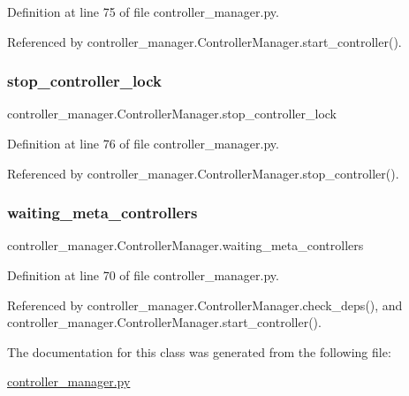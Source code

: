 Definition at line 75 of file controller\+\_\+manager.\+py.



Referenced by controller\+\_\+manager.\+Controller\+Manager.\+start\+\_\+controller().

\mbox{\label{classcontroller__manager_1_1_controller_manager_a974bae4de69c9ccb568def314be7d6b6}} 
\subsubsection{\texorpdfstring{stop\+\_\+controller\+\_\+lock}{stop\_controller\_lock}}
{\footnotesize\ttfamily controller\+\_\+manager.\+Controller\+Manager.\+stop\+\_\+controller\+\_\+lock}



Definition at line 76 of file controller\+\_\+manager.\+py.



Referenced by controller\+\_\+manager.\+Controller\+Manager.\+stop\+\_\+controller().

\mbox{\label{classcontroller__manager_1_1_controller_manager_a10faf09a5de3efe436c7862fee2d9709}} 
\subsubsection{\texorpdfstring{waiting\+\_\+meta\+\_\+controllers}{waiting\_meta\_controllers}}
{\footnotesize\ttfamily controller\+\_\+manager.\+Controller\+Manager.\+waiting\+\_\+meta\+\_\+controllers}



Definition at line 70 of file controller\+\_\+manager.\+py.



Referenced by controller\+\_\+manager.\+Controller\+Manager.\+check\+\_\+deps(), and controller\+\_\+manager.\+Controller\+Manager.\+start\+\_\+controller().



The documentation for this class was generated from the following file\+:\begin{DoxyCompactItemize}
\item 
\hyperlink{controller__manager_8py}{controller\+\_\+manager.\+py}\end{DoxyCompactItemize}
